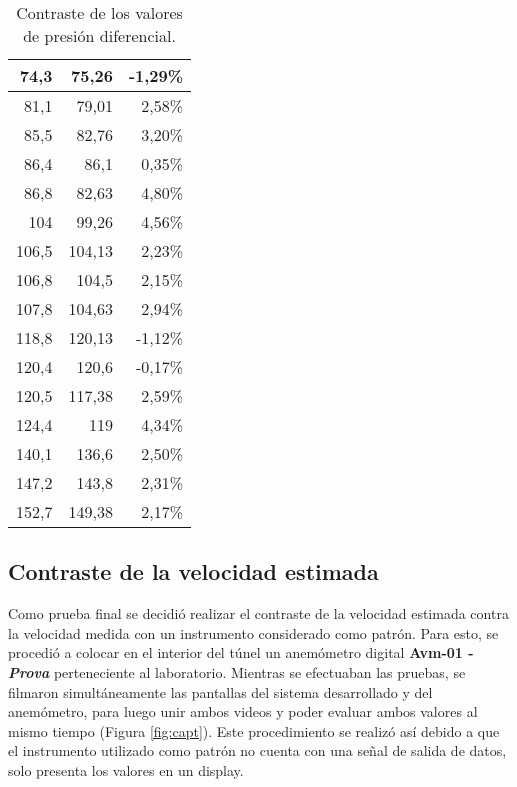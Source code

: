 \begin{table}[H]
\begin{tabular}{|r|r|r}
			74,3 & 75,26 & \multicolumn{1}{r|}{-1,29\%} \\ \hline
			81,1 & 79,01 & \multicolumn{1}{r|}{2,58\%} \\ \hline
			85,5 & 82,76 & \multicolumn{1}{r|}{3,20\%} \\ \hline
			86,4 & 86,1 & \multicolumn{1}{r|}{0,35\%} \\ \hline
			86,8 & 82,63 & \multicolumn{1}{r|}{4,80\%} \\ \hline
			104 & 99,26 & \multicolumn{1}{r|}{4,56\%} \\ \hline
			106,5 & 104,13 & \multicolumn{1}{r|}{2,23\%} \\ \hline
			106,8 & 104,5 & \multicolumn{1}{r|}{2,15\%} \\ \hline
			107,8 & 104,63 & \multicolumn{1}{r|}{2,94\%} \\ \hline
			118,8 & 120,13 & \multicolumn{1}{r|}{-1,12\%} \\ \hline
			120,4 & 120,6 & \multicolumn{1}{r|}{-0,17\%} \\ \hline
			120,5 & 117,38 & \multicolumn{1}{r|}{2,59\%} \\ \hline
			124,4 & 119 & \multicolumn{1}{r|}{4,34\%} \\ \hline
			140,1 & 136,6 & \multicolumn{1}{r|}{2,50\%} \\ \hline
			147,2 & 143,8 & \multicolumn{1}{r|}{2,31\%} \\ \hline
			152,7 & 149,38 & \multicolumn{1}{r|}{2,17\%} \\ \hline
		\end{tabular}
	\caption{Contraste de los valores de presión diferencial.}
	\label{difpres}

\end{table}

\subsection{Contraste de la velocidad estimada}
Como prueba final se decidió realizar el contraste de la velocidad estimada contra la velocidad medida con un instrumento considerado como patrón. Para esto, se procedió a colocar en el interior del túnel un anemómetro digital \textbf{Avm-01 -\textit{ Prova}} perteneciente al laboratorio. Mientras se efectuaban las pruebas, se filmaron simultáneamente las pantallas del sistema desarrollado y del anemómetro, para luego unir ambos videos y poder evaluar ambos valores al mismo tiempo (Figura \ref{fig:capt}). Este procedimiento se realizó así debido a que el instrumento utilizado como patrón no cuenta con una señal de salida de datos, solo presenta los valores en un display.

